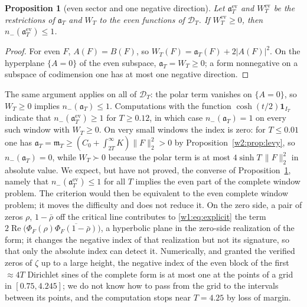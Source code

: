 \documentclass[11pt]{amsart}
\newtheorem{proposition}[theorem]{Proposition}
\theoremstyle{definition}
\theoremstyle{remark}
\numberwithin{equation}{section}
\DeclareMathOperator{\Rel}{Re}
\newcommand{\IT}{I_T}                                  %
\newcommand{\PhiF}{\Phi_F}                             %
\newcommand{\DT}{\mathcal{D}_T}                        %
\newcommand{\mT}{\mathfrak{m}_T}                       %
\newcommand{\aT}{\mathfrak{a}_T}                       %
\newcommand{\WT}{W_T}                                  %
\begin{document}
\begin{proposition}[even sector and one negative direction]\label{w5:prop:evenone}
Let $\aT^{\mathrm{ev}}$ and $\WT^{\mathrm{ev}}$ be the restrictions of $\aT$ and $\WT$ to the even functions of $\DT$. If
$\WT^{\mathrm{ev}}\ge0$, then $n_-(\aT^{\mathrm{ev}})\le1$.
\end{proposition}

\begin{proof}
For even $F$, $A(F)=B(F)$, so $\WT(F)=\aT(F)+2|A(F)|^2$. On the hyperplane $\{A=0\}$ of the even subspace,
$\aT=\WT\ge0$; a form nonnegative on a subspace of codimension one has at most one negative direction.
\end{proof}

The same argument applies on all of $\DT$: the polar term vanishes on $\{A=0\}$, so $\WT\ge0$ implies $n_-(\aT)\le1$.
Computations with the function $\cosh(t/2)\mathbf 1_{\IT}$ indicate that $n_-(\aT^{\mathrm{ev}})\ge1$ for $T\ge0.12$, in
which case $n_-(\aT)=1$ on every such window with $\WT\ge0$. On very small windows the index is zero: for $T\le0.01$ one
has $\aT=\mT\ge(C_0+\int_{2T}^\infty K)\|F\|_2^2>0$ by Proposition~\ref{w2:prop:levy}, so $n_-(\aT)=0$, while $\WT\succ0$
because the polar term is at most $4\sinh T\,\|F\|_2^2$ in absolute value. We expect, but have not proved, the converse
of Proposition~\ref{w5:prop:evenone}, namely that $n_-(\aT^{\mathrm{ev}})\le1$ for all $T$ implies the even part of the
complete window problem. The criterion would then be equivalent to the even complete window problem; it moves the
difficulty and does not reduce it. On the zero side, a pair of zeros $\rho$, $1-\bar\rho$ off the critical line
contributes to \eqref{w1:eq:explicit} the term $2\Rel\bigl(\PhiF(\rho)\overline{\PhiF(1-\bar\rho)}\bigr)$, a hyperbolic
plane in the zero-side realization of the form; it changes the negative index of that realization but not its signature,
so that only the absolute index can detect it.
Numerically, and granted the verified zeros of $\zeta$ up to a large height, the negative index of the even block of
the first $\approx4T$ Dirichlet sines of the complete form is at most one at the points of a grid in $[0.75,4.245]$; we
do not know how to pass from the grid to the intervals between its points, and the computation stops near $T=4.25$ by
loss of margin.
\end{document}
